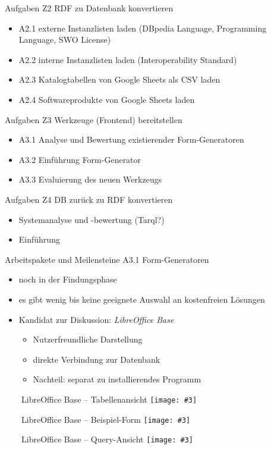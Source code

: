 \documentclass[aspectratio=169]{beamer}
\newcommand{\imageslide}[4][]
{
\begin{frame}[plain]{~~~~#2}
\vspace{0.2em}
\centering\texttt{[image: \#3]}
\\#1
\note{#4}
\end{frame}
}
\begin{document}
\begin{frame}{Aufgaben Z2 RDF zu Datenbank konvertieren}
\begin{itemize}
\item A2.1 externe Instanzlisten laden (DBpedia Language, Programming Language, SWO License) \checkmark
\item A2.2 interne Instanzlisten laden (Interoperability Standard) \checkmark
\item A2.3 Katalogtabellen von Google Sheets als CSV laden \checkmark
\item A2.4 Softwareprodukte von Google Sheets laden
\end{itemize}
\end{frame}

\begin{frame}{Aufgaben Z3 Werkzeuge (Frontend) bereitstellen}
\begin{itemize}
\item A3.1 Analyse und Bewertung existierender Form-Generatoren
\item A3.2 Einführung Form-Generator
\item A3.3 Evaluierung des neuen Werkzeugs
\end{itemize}
\end{frame}

\begin{frame}{Aufgaben Z4 DB zurück zu RDF konvertieren}
\begin{itemize}
\item Systemanalyse und -bewertung (Tarql?)
\item Einführung
\end{itemize}
\end{frame}

\begin{frame}{Arbeitspakete und Meilensteine A3.1 Form-Generatoren}
\begin{itemize}
\item noch in der Findungsphase
\item es gibt wenig bis keine geeignete Auswahl an kostenfreien Lösungen
\item Kandidat zur Diskussion: \emph{LibreOffice Base}
\begin{itemize}
  \item Nutzerfreundliche Darstellung
  \item direkte Verbindung zur Datenbank
  \item Nachteil: separat zu installierendes Programm
\end{itemize}
\end{itemize}
\end{frame}

\imageslide{LibreOffice Base -- Tabellenansicht}{img_neu/base-tables.png}{}
\imageslide{LibreOffice Base -- Beispiel-Form}{img_neu/base-form.png}{}
\imageslide{LibreOffice Base -- Query-Ansicht}{img_neu/base-query.png}{}

\iffalse
\begin{frame}{Arbeitspakete und Meilensteine}
\begin{itemize}
\item
\item
\end{itemize}
\end{frame}
\fi
\end{document}
